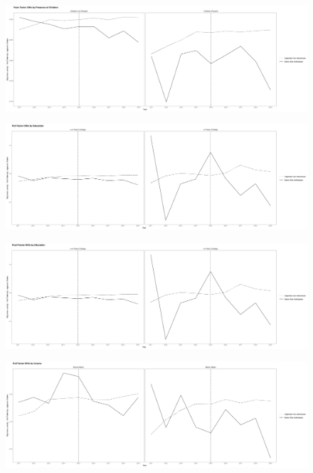 \documentclass[12pt,letterpaper]{article}
\begin{document}
\begin{figure}[h]
    \centering
    \includegraphics[width=0.75\linewidth]{outputs/summary_stats/child_ante_diffs.png}
    \caption{}
    \label{fig: fig:enter-label}
\end{figure}

\begin{figure}[h]
    \centering
    \includegraphics[width=0.75\linewidth]{outputs/summary_stats/educ_post_diffs.png}
    \caption{}
    \label{fig: fig:enter-label}
\end{figure}

\begin{figure}[h]
    \centering
    \includegraphics[width=0.75\linewidth]{outputs/summary_stats/educ_ante_diffs.png}
    \caption{}
    \label{fig: fig:enter-label}
\end{figure}

\begin{figure}[h]
    \centering
    \includegraphics[width=0.75\linewidth]{outputs/summary_stats/inc_post_diffs.png}
    \caption{}
    \label{fig: fig:enter-label}
\end{figure}
\end{document}
